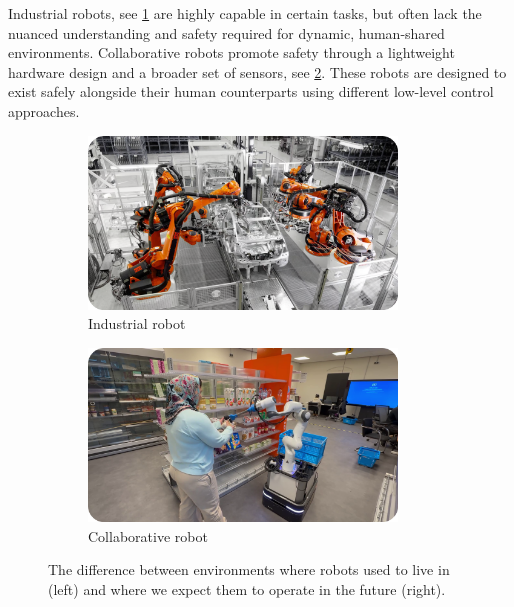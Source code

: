 Industrial robots, see \cref{fig:industrial_robot}
are highly capable in certain tasks, but
often lack the nuanced understanding and safety required for
dynamic, human-shared environments. Collaborative robots
promote safety through a lightweight
hardware design and a broader set of sensors, see
\cref{fig:collaborative_robot}. These
robots are designed to exist safely alongside their human
counterparts using different low-level control approaches.
%
\begin{figure}[t]
  \centering
  \begin{subfigure}{0.5\textwidth}
    \centering
    \includegraphics[width=0.9\textwidth]{src/introduction/img/industrial_robot.png}
    \caption{Industrial robot}
    \label{fig:industrial_robot}
  \end{subfigure}%
  \begin{subfigure}{0.5\textwidth}
    \centering
    \includegraphics[width=0.9\textwidth]{src/introduction/img/collaborative_robot.png}
    \caption{Collaborative robot}
    \label{fig:collaborative_robot}
  \end{subfigure}
  \caption[]{The difference between environments where robots
  used to live in (left) \footnotemark and where we expect them to operate
  in the future (right).}
  \label{fig:different_robots}
\end{figure}

